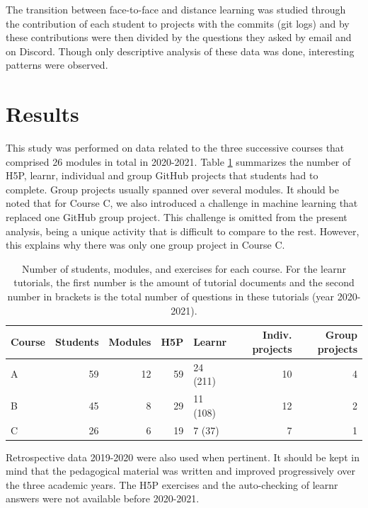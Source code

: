 \documentclass{aims} %
\theoremstyle{definition}
\begin{document}
The transition between face-to-face and distance learning was studied
through the contribution of each student to projects with the commits
(git logs) and by these contributions were then divided by the questions
they asked by email and on Discord. Though only descriptive analysis of
these data was done, interesting patterns were observed.

\hypertarget{results}{%
\section{Results}\label{results}}

This study was performed on data related to the three successive courses
that comprised 26 modules in total in 2020-2021. Table
\ref {tab:tab_course} summarizes the number of H5P, learnr, individual
and group GitHub projects that students had to complete. Group projects
usually spanned over several modules. It should be noted that for Course
C, we also introduced a challenge in machine learning that replaced one
GitHub group project. This challenge is omitted from the present
analysis, being a unique activity that is difficult to compare to the
rest. However, this explains why there was only one group project in
Course C.

\begin{table}

\caption{\label{tab:tab_course_summary}\label{tab:tab_course} Number of students, modules, and exercises for each course. For the learnr tutorials, the first number is the amount of tutorial documents and the second number in brackets is the total number of questions in these tutorials (year 2020-2021).}
\centering
\begin{tabular}[t]{l|r|r|r|l|r|r}
\hline
Course & Students & Modules & H5P & Learnr & Indiv. projects & Group projects\\
\hline
A & 59 & 12 & 59 & 24 (211) & 10 & 4\\
\hline
B & 45 & 8 & 29 & 11 (108) & 12 & 2\\
\hline
C & 26 & 6 & 19 & 7 (37) & 7 & 1\\
\hline
\end{tabular}
\end{table}

Retrospective data 2019-2020 \cite{Grosjeandataset2019} were also used
when pertinent. It should be kept in mind that the pedagogical material
was written and improved progressively over the three academic years.
The H5P exercises and the auto-checking of learnr answers were not
available before 2020-2021.
\end{document}
